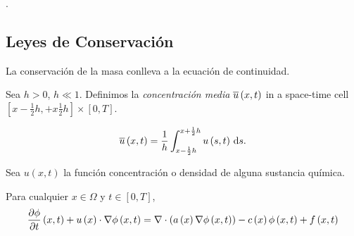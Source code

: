 \begin{theorem}
    .
\end{theorem}

\subsection{Leyes de Conservación}

La conservación de la masa conlleva a la ecuación de continuidad.

\begin{definition}
    Sea $h>0$, $h\ll 1$.
    Definimos la \emph{concentración media}
    \begin{math}
        \overline{u}\left(x,t\right)
    \end{math}
    in a space-time cell
    \begin{math}
        \left[
            x-\frac{1}{2}h,
            +x\frac{1}{2}h
            \right]
        \times
        \left[
            0,T
            \right]
    \end{math}.

    \begin{equation*}
        \averageconcentration=
        \dfrac{1}{h}
        \int_{x-\frac{1}{2}h}^{x+\frac{1}{2}h}
        u
        \left(
        s,t
        \right)
        \dl s.
    \end{equation*}
\end{definition}

Sea
\begin{math}
    u\left(x,t\right)
\end{math}
la función concentración o densidad de alguna sustancia química.

\begin{definition}
    Para cualquier $x\in\Omega$ y $t\in\left[0,T\right]$,
    \begin{equation}\label{eq:advecion-difussion-reaction}
        \diffp{\phi}{t}\left(x,t\right)+
        u\left(x\right)\cdot
        \nabla\phi\left(x,t\right)=
        \nabla\cdot\left(a\left(x\right)\nabla\phi\left(x,t\right)\right)-
        c\left(x\right)\phi\left(x,t\right)
        +f\left(x,t\right)
    \end{equation}
\end{definition}


